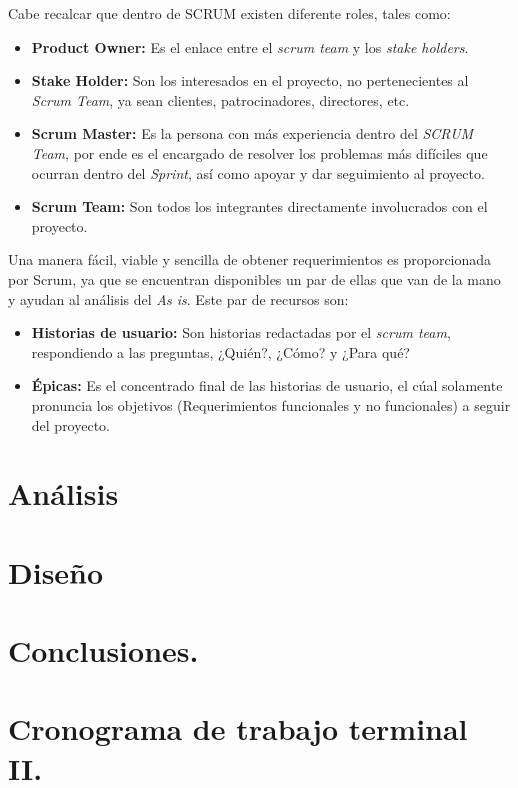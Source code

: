 \documentclass[10pt]{article}
\begin{document}
Cabe recalcar que dentro de SCRUM existen diferente roles, tales como:
\begin{itemize}
    \item \textbf{Product Owner:} Es el enlace entre el \textit{scrum team} y los \textit{stake holders}.
    \item \textbf{Stake Holder:} Son los interesados en el proyecto, no pertenecientes al \textit{Scrum Team}, ya sean clientes, patrocinadores, directores, etc.
    \item \textbf{Scrum Master:} Es la persona con más experiencia dentro del \textit{SCRUM Team}, por ende es el encargado de resolver los problemas más difíciles que ocurran dentro del \textit{Sprint}, así como apoyar y dar seguimiento al proyecto.
    \item \textbf{Scrum Team:} Son todos los integrantes directamente involucrados con el proyecto.
\end{itemize}

Una manera fácil, viable y sencilla de obtener requerimientos es proporcionada por Scrum, ya que se encuentran disponibles un par de ellas que van de la mano y ayudan al análisis del \textit{As is}. Este par de recursos son: 

\begin{itemize}
    \item \textbf{Historias de usuario:} Son historias redactadas por el \textit{scrum team}, respondiendo a las preguntas, ¿Quién?, ¿Cómo? y ¿Para qué?
    \item \textbf{Épicas:} Es el concentrado final de las historias de usuario, el cúal solamente pronuncia los objetivos (Requerimientos funcionales y no funcionales) a seguir del proyecto.
\end{itemize}

\section{Análisis}
\section{Diseño}

\section{Conclusiones.}

\section{Cronograma de trabajo terminal II.}
\end{document}
